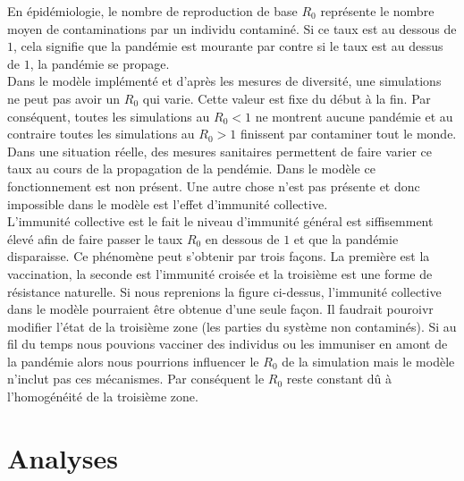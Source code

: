 En épidémiologie, le nombre de reproduction de base $R_0$ représente le nombre moyen de contaminations par un individu contaminé. Si ce taux est au dessous de $1$, cela signifie que la pandémie est mourante par contre si le taux est au dessus de $1$, la pandémie se propage.\\

Dans le modèle implémenté et d'après les mesures de diversité, une simulations ne peut pas avoir un $R_0$ qui varie. Cette valeur est fixe du début à la fin. Par conséquent, toutes les simulations au $R_0 < 1$ ne montrent aucune pandémie et au contraire toutes les simulations au $R_0 > 1$ finissent par contaminer tout le monde. Dans une situation réelle, des mesures sanitaires permettent de faire varier ce taux au cours de la propagation de la pendémie. Dans le modèle ce fonctionnement est non présent. Une autre chose n'est pas présente et donc impossible dans le modèle est l'effet d'immunité collective.\\

L'immunité collective est le fait le niveau d'immunité général est siffisemment élevé afin de faire passer le taux $R_0$ en dessous de $1$ et que la pandémie disparaisse. Ce phénomène peut s'obtenir par trois façons. La première est la vaccination, la seconde est l'immunité croisée et la troisième est une forme de résistance naturelle. Si nous reprenions la figure ci-dessus, l'immunité collective dans le modèle pourraient être obtenue d'une seule façon. Il faudrait pouroivr modifier l'état de la troisième zone (les parties du système non contaminés). Si au fil du temps nous pouvions vacciner des individus ou les immuniser en amont de la pandémie alors nous pourrions influencer le $R_0$ de la simulation mais le modèle n'inclut pas ces mécanismes. Par conséquent le $R_0$ reste constant dû à l'homogénéité de la troisième zone.


\section{Analyses}

